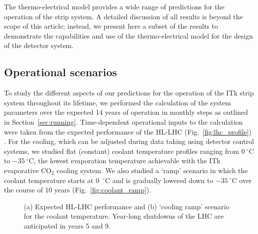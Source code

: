 
The thermo-electrical model provides a wide range of predictions for the operation of the strip system. A detailed discussion of all results is beyond the scope of this article; instead, we present here a subset of the results to demonstrate the capabilities and use of the thermo-electrical model for the design of the detector system.

\subsection{Operational scenarios}\label{sec:opscenarios}
To study the different aspects of our predictions for the operation of the ITk strip system throughout its lifetime, we performed the calculation of the system parameters over the expected 14 years of operation in monthly steps as outlined in Section~\ref{sec:running}. Time-dependent operational inputs to the calculation were taken from the expected performance of the HL-LHC (Fig.~\ref{fig:lhc_profile}) \cite{ApollinariG.:2017ojx}. For the cooling, which can be adjusted during data taking using detector control systems, we studied flat (constant) coolant temperature profiles ranging from $0~^\circ$C to $-35~^\circ$C, the lowest evaporation temperature achievable with the ITk evaporative CO$_2$ cooling system. We also studied a `ramp' scenario in which the coolant temperature starts at 0~$^\circ$C and is gradually lowered down to $-35~^\circ$C over the course of 10 years (Fig.~\ref{fig:coolant_ramp}).

\begin{figure}[t!]
\centering
{}\quad\quad
{}
\caption{(a) Expected HL-LHC performance and (b) `cooling ramp' scenario for the coolant temperature. Year-long shutdowns of the LHC are anticipated in years 5 and 9.}
\label{fig:opscenarios}
\end{figure}

